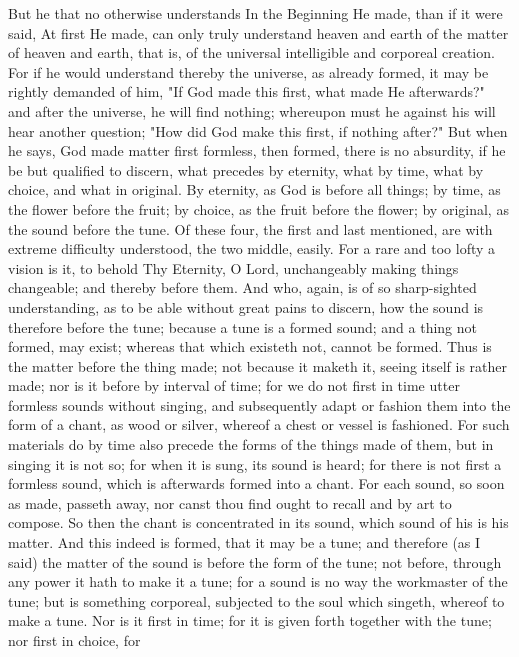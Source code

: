 \documentclass[b5paper,openright,12pt,twoside]{book}
\begin{document}
But he that no otherwise understands In the Beginning He made, than if
it were said, At first He made, can only truly understand heaven and
earth of the matter of heaven and earth, that is, of the universal
intelligible and corporeal creation. For if he would understand thereby
the universe, as already formed, it may be rightly demanded of him, "If
God made this first, what made He afterwards?" and after the universe,
he will find nothing; whereupon must he against his will hear another
question; "How did God make this first, if nothing after?" But when
he says, God made matter first formless, then formed, there is no
absurdity, if he be but qualified to discern, what precedes by eternity,
what by time, what by choice, and what in original. By eternity, as
God is before all things; by time, as the flower before the fruit; by
choice, as the fruit before the flower; by original, as the sound before
the tune. Of these four, the first and last mentioned, are with extreme
difficulty understood, the two middle, easily. For a rare and too lofty
a vision is it, to behold Thy Eternity, O Lord, unchangeably making
things changeable; and thereby before them. And who, again, is of
so sharp-sighted understanding, as to be able without great pains to
discern, how the sound is therefore before the tune; because a tune is
a formed sound; and a thing not formed, may exist; whereas that which
existeth not, cannot be formed. Thus is the matter before the thing
made; not because it maketh it, seeing itself is rather made; nor is it
before by interval of time; for we do not first in time utter formless
sounds without singing, and subsequently adapt or fashion them into
the form of a chant, as wood or silver, whereof a chest or vessel is
fashioned. For such materials do by time also precede the forms of the
things made of them, but in singing it is not so; for when it is sung,
its sound is heard; for there is not first a formless sound, which is
afterwards formed into a chant. For each sound, so soon as made, passeth
away, nor canst thou find ought to recall and by art to compose. So
then the chant is concentrated in its sound, which sound of his is his
matter. And this indeed is formed, that it may be a tune; and therefore
(as I said) the matter of the sound is before the form of the tune; not
before, through any power it hath to make it a tune; for a sound is no
way the workmaster of the tune; but is something corporeal, subjected to
the soul which singeth, whereof to make a tune. Nor is it first in time;
for it is given forth together with the tune; nor first in choice, for
\end{document}
